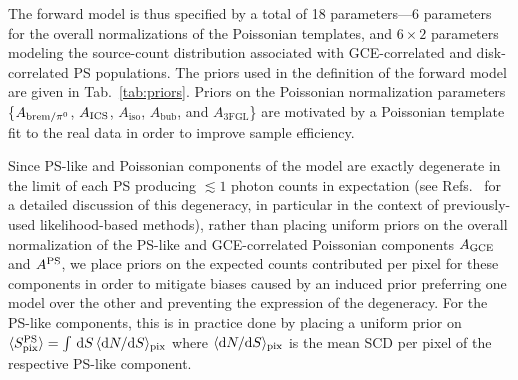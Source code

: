 \documentclass[prd,aps,10pt,nofootinbib,twocolumn,superscriptaddress,preprintnumbers,balancelastpage,longbibliography]{revtex4-1}
\begin{document}
The forward model is thus specified by a total of 18 parameters---6 parameters for the overall normalizations of the Poissonian templates, and $6\times2$ parameters modeling the source-count distribution associated with GCE-correlated and disk-correlated PS populations. The priors used in the definition of the forward model are given in Tab.~\ref{tab:priors}. Priors on the Poissonian normalization parameters \{$A_{{\rm brem}/\pi^0}$, $A_{\rm ICS}$, $A_\text{iso}$, $A_\text{bub}$, and $A_\text{3FGL}$\} are motivated by a Poissonian template fit to the real \Fermi data in order to improve sample efficiency. 

Since PS-like and Poissonian components of the model are exactly degenerate in the limit of each PS producing $\lesssim 1$ photon counts in expectation (see Refs.~\cite{Chang:2019ars,Collin:2021ufc} for a detailed discussion of this degeneracy, in particular in the context of previously-used likelihood-based methods), rather than placing uniform priors on the overall normalization of the PS-like and GCE-correlated Poissonian components $A_{\rm GCE}$ and $A^{\rm PS}$, we place priors on the expected counts contributed per pixel for these components in order to mitigate biases caused by an induced prior preferring one model over the other and preventing the expression of the degeneracy. For the PS-like components, this is in practice done by placing a uniform prior on $\langle S_{\rm pix}^{\rm PS} \rangle = \int\,\mathrm{d} S\,\langle \mathrm{d} N/\mathrm{d} S \rangle_{\rm pix}$ where $\langle \mathrm{d} N/\mathrm{d} S \rangle_{\rm pix}$ is the mean SCD per pixel of the respective PS-like component.
\end{document}
